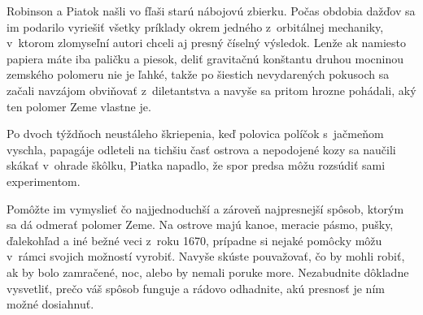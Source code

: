 Robinson a Piatok našli vo fľaši starú nábojovú zbierku. Počas obdobia
dažďov sa im podarilo vyriešiť všetky príklady okrem jedného
z~orbitálnej mechaniky, v~ktorom zlomyseľní autori chceli aj presný
číselný výsledok. Lenže ak namiesto papiera máte iba paličku a piesok,
deliť gravitačnú konštantu druhou mocninou zemského polomeru nie je
ľahké, takže po šiestich nevydarených pokusoch sa začali navzájom
obviňovať z~diletantstva a navyše sa pritom hrozne pohádali, aký ten
polomer Zeme vlastne je.

Po dvoch týždňoch neustáleho škriepenia, keď polovica políčok s~jačmeňom
vyschla, papagáje odleteli na tichšiu časť ostrova a nepodojené kozy sa
naučili skákať v~ohrade škôlku, Piatka napadlo, že spor predsa môžu
rozsúdiť sami experimentom.

Pomôžte im vymyslieť čo najjednoduchší a zároveň najpresnejší spôsob,
ktorým sa dá odmerať polomer Zeme. Na ostrove majú kanoe, meracie pásmo,
pušky, ďalekohľad a iné bežné veci z~roku 1670, prípadne si nejaké
pomôcky môžu v~rámci svojich možností vyrobiť. Navyše skúste pouvažovať,
čo by mohli robiť, ak by bolo zamračené, noc, alebo by nemali poruke
more. Nezabudnite dôkladne vysvetliť, prečo váš spôsob funguje a rádovo
odhadnite, akú presnosť je ním možné dosiahnuť.

